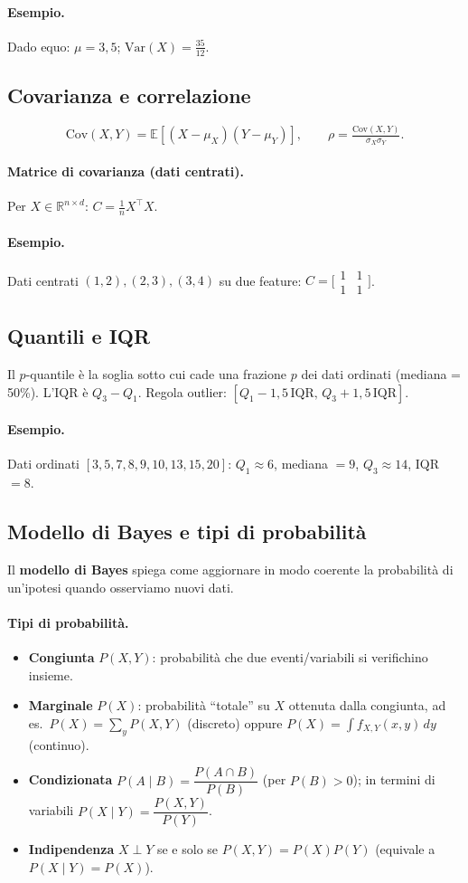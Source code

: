 \paragraph{Esempio.} Dado equo: \(\mu=3{,}5\); \(\mathrm{Var}(X)=\tfrac{35}{12}\).
\subsection{Covarianza e correlazione}
\[\mathrm{Cov}(X,Y)=\mathbb{E}[(X-\mu_X)(Y-\mu_Y)],\qquad \rho=\tfrac{\mathrm{Cov}(X,Y)}{\sigma_X\sigma_Y}.\]
\paragraph{Matrice di covarianza (dati centrati).} Per \(X\in\mathbb{R}^{n\times d}\): \(C=\tfrac{1}{n}X^\top X\).
\paragraph{Esempio.} Dati centrati \((1,2),(2,3),(3,4)\) su due feature: \(C=\bigl[\begin{smallmatrix}1&1\\1&1\end{smallmatrix}\bigr]\).
\subsection{Quantili e IQR}
Il \(p\)-quantile è la soglia sotto cui cade una frazione \(p\) dei dati ordinati (mediana = 50\%). L'IQR è \(Q_3-Q_1\). Regola outlier: \([Q_1-1{,}5\,\mathrm{IQR},\,Q_3+1{,}5\,\mathrm{IQR}]\).
\paragraph{Esempio.} Dati ordinati \([3,5,7,8,9,10,13,15,20]\): \(Q_1\approx6\), mediana \(=9\), \(Q_3\approx14\), IQR \(=8\).

\subsection{Modello di Bayes e tipi di probabilità}\label{subsec:bayes}
Il \textbf{modello di Bayes} spiega come aggiornare in modo coerente la probabilità di
un’ipotesi quando osserviamo nuovi dati.

\paragraph{Tipi di probabilità.}
\begin{itemize}
  \item \textbf{Congiunta} $P(X,Y)$: probabilità che due eventi/variabili si verifichino insieme.
  \item \textbf{Marginale} $P(X)$: probabilità “totale” su $X$ ottenuta dalla congiunta,
        ad es.\ $P(X)=\sum_{y}P(X,Y)$ (discreto) oppure $P(X)=\int f_{X,Y}(x,y)\,dy$ (continuo).
  \item \textbf{Condizionata} $P(A\mid B)=\dfrac{P(A\cap B)}{P(B)}$ (per $P(B)>0$);
        in termini di variabili $P(X\mid Y)=\dfrac{P(X,Y)}{P(Y)}$.
  \item \textbf{Indipendenza} $X\perp Y$ se e solo se $P(X,Y)=P(X)P(Y)$ (equivale a $P(X\mid Y)=P(X)$).
\end{itemize}

